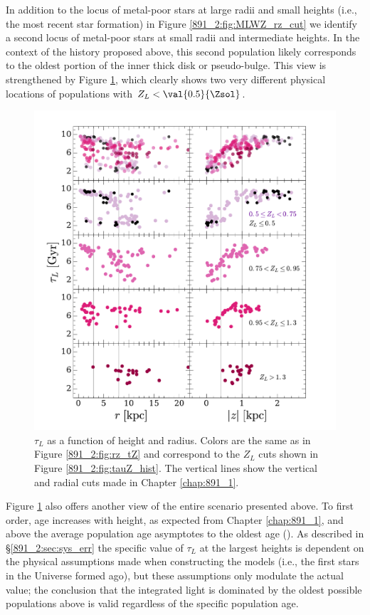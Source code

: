 In addition to the locus of metal-poor stars at large radii and small
heights (i.e., the most recent star formation) in Figure
\ref{891_2:fig:MLWZ_rz_cut} we identify a second locus of metal-poor
stars at small radii and intermediate heights. In the context of the
history proposed above, this second population likely corresponds to
the oldest portion of the inner thick disk or pseudo-bulge. This view
is strengthened by Figure \ref{891_2:fig:MLWA_rz_cut}, which clearly
shows two very different physical locations of populations with $Z_L <
\val{0.5}{\Zsol}$.

\begin{figure}
  \centering
  \includegraphics[width=\textwidth]{891_2/figs/MLWA_rz_cut.pdf}
  \caption[$\tau_L$ as function of
    ($r,|z|$)]{\fixspacing\label{891_2:fig:MLWA_rz_cut}$\tau_L$ as a
    function of height and radius. Colors are the same as in Figure
    \ref{891_2:fig:rz_tZ} and correspond to the $Z_L$ cuts shown in
    Figure \ref{891_2:fig:tauZ_hist}. The vertical lines show the
    vertical and radial cuts made in Chapter \ref{chap:891_1}.}
\end{figure}

Figure \ref{891_2:fig:MLWA_rz_cut} also offers another view of the
entire scenario presented above. To first order, age increases with
height, as expected from Chapter \ref{chap:891_1}, and above
 the average population age asymptotes to the oldest age
(). As described in \S\ref{891_2:sec:sys_err} the
specific value of $\tau_L$ at the largest heights is dependent on the
physical assumptions made when constructing the models (i.e., the
first stars in the Universe formed  ago), but these
assumptions only modulate the actual value; the conclusion that the
integrated light is dominated by the oldest possible populations above
 is valid regardless of the specific population age.

